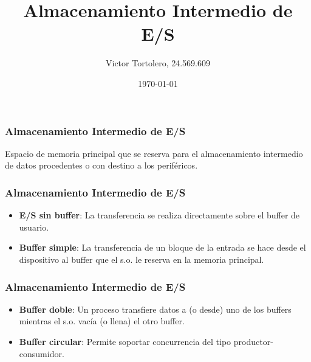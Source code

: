 \documentclass{beamer}
\title{Almacenamiento Intermedio de E/S}
\author{Victor Tortolero, 24.569.609}
\institute{
	Sistemas Operativos, FACYT
}
\date{\today}
\begin{document}

\begin{frame}
	\titlepage
\end{frame}


\begin{frame}
	\frametitle{Almacenamiento Intermedio de E/S}
	
	Espacio de memoria principal que se reserva para el almacenamiento intermedio de datos procedentes o con destino a los periféricos.
	
\end{frame}

\begin{frame}
	\frametitle{Almacenamiento Intermedio de E/S}
	\begin{itemize}
		\item \textbf{E/S sin buffer}: La transferencia se realiza directamente sobre el buffer de usuario.
		\item \textbf{Buffer simple}: La transferencia de un bloque de la entrada se hace desde el dispositivo al
		buffer que el s.o. le reserva en la memoria principal.
	\end{itemize}
\end{frame}
	
\begin{frame}
	\frametitle{Almacenamiento Intermedio de E/S}
	\begin{itemize}
		\item \textbf{Buffer doble}: Un proceso transfiere datos a (o desde) uno de los buffers mientras el s.o. vacía (o llena) el otro buffer.
		\item \textbf{Buffer circular}: Permite soportar concurrencia del tipo productor-consumidor.
	\end{itemize}
\end{frame}
\end{document}
